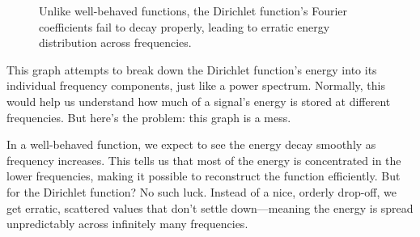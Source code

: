 \documentclass{article}
\begin{document}
\begin{figure}[h]
    \centering
    \caption{Unlike well-behaved functions, the Dirichlet function's Fourier coefficients fail to decay properly, leading to erratic energy distribution across frequencies.}
\end{figure}

This graph attempts to break down the Dirichlet function’s energy into its individual frequency components, just like a power spectrum. Normally, this would help us understand how much of a signal’s energy is stored at different frequencies. But here’s the problem: this graph is a mess.

In a well-behaved function, we expect to see the energy decay smoothly as frequency increases. This tells us that most of the energy is concentrated in the lower frequencies, making it possible to reconstruct the function efficiently. But for the Dirichlet function? No such luck. Instead of a nice, orderly drop-off, we get erratic, scattered values that don’t settle down—meaning the energy is spread unpredictably across infinitely many frequencies.
\end{document}
